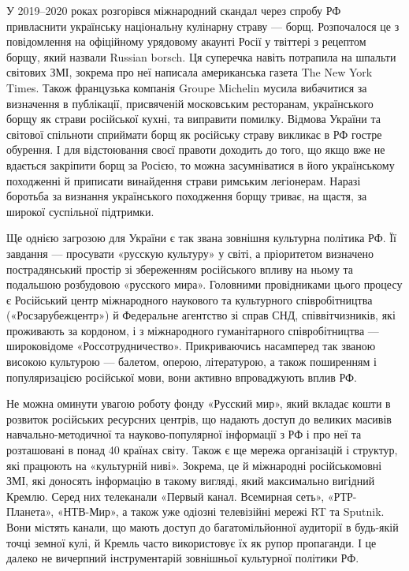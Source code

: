 У 2019–2020 роках розгорівся міжнародний скандал через спробу РФ привласнити
українську національну кулінарну страву — борщ. Розпочалося це з повідомлення
на офіційному урядовому акаунті Росії у твіттері з рецептом борщу, який назвали
Russian borsch. Ця суперечка навіть потрапила на шпальти світових ЗМІ, зокрема
про неї написала американська газета The New York Times. Також французька
компанія Groupe Michelin мусила вибачитися за визначення в публікації,
присвяченій московським ресторанам, українського борщу як страви російської
кухні, та виправити помилку. Відмова України та світової спільноти сприймати
борщ як російську страву викликає в РФ гостре обурення. І для відстоювання
своєї правоти доходить до того, що якщо вже не вдається закріпити борщ за
Росією, то можна засумніватися в його українському походженні й приписати
винайдення страви римським легіонерам. Наразі боротьба за визнання українського
походження борщу триває, на щастя, за широкої суспільної підтримки.


Ще однією загрозою для України є так звана зовнішня культурна політика РФ. Її
завдання — просувати «русскую культуру» у світі, а пріоритетом визначено
пострадянський простір зі збереженням російського впливу на ньому та подальшою
розбудовою «русского мира». Головними провідниками цього процесу є Російський
центр міжнародного наукового та культурного співробітництва («Росзарубежцентр»)
й Федеральне агентство зі справ СНД, співвітчизників, які проживають за
кордоном, і з міжнародного гуманітарного співробітництва — широковідоме
«Россотрудничество». Прикриваючись насамперед так званою високою культурою —
балетом, оперою, літературою, а також поширенням і популяризацією російської
мови, вони активно впроваджують вплив РФ.

Не можна оминути увагою роботу фонду «Русский мир», який вкладає кошти в
розвиток російських ресурсних центрів, що надають доступ до великих масивів
навчально-методичної та науково-популярної інформації з РФ і про неї та
розташовані в понад 40 країнах світу. Також є ще мережа організацій і структур,
які працюють на «культурній ниві». Зокрема, це й міжнародні російськомовні ЗМІ,
які доносять інформацію в такому вигляді, який максимально вигідний Кремлю.
Серед них телеканали «Первый канал. Всемирная сеть», «РТР-Планета», «НТВ-Мир»,
а також уже одіозні телевізійні мережі RT та Sputnik. Вони містять канали, що
мають доступ до багатомільйонної аудиторії в будь-якій точці земної кулі, й
Кремль часто використовує їх як рупор пропаганди. І це далеко не вичерпний
інструментарій зовнішньої культурної політики РФ.

